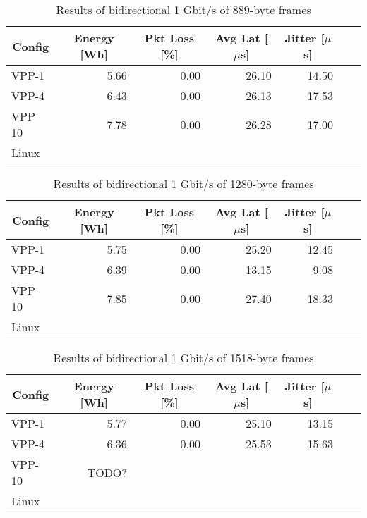 \begin{table}[h!]
\centering
\caption{Results of bidirectional 1 Gbit/s of 889-byte frames}
\begin{tabular}{|l|r|r|r|r|r|r|}
\hline
\multicolumn{1}{|c|}{\textbf{Config}} &
\multicolumn{1}{c|}{\textbf{Energy [Wh] }} &
\multicolumn{1}{c|}{\textbf{Pkt Loss [\%]}} &
\multicolumn{1}{c|}{\textbf{Avg Lat [$\mu$s]}} &
\multicolumn{1}{c|}{\textbf{Jitter [$\mu$s]}} \\
\hline 
VPP-1 & 5.66 & 0.00 & 26.10 & 14.50 \\
VPP-4 & 6.43 & 0.00 & 26.13 & 17.53 \\
VPP-10 & 7.78 & 0.00 & 26.28 & 17.00 \\
Linux &  &  &  &  \\
\hline
\end{tabular}
\label{tab:1budp:889B}
\end{table}

\begin{table}[h!]
\centering
\caption{Results of bidirectional 1 Gbit/s of 1280-byte frames}
\begin{tabular}{|l|r|r|r|r|r|r|}
\hline
\multicolumn{1}{|c|}{\textbf{Config}} &
\multicolumn{1}{c|}{\textbf{Energy [Wh] }} &
\multicolumn{1}{c|}{\textbf{Pkt Loss [\%]}} &
\multicolumn{1}{c|}{\textbf{Avg Lat [$\mu$s]}} &
\multicolumn{1}{c|}{\textbf{Jitter [$\mu$s]}} \\
\hline 
VPP-1 & 5.75 & 0.00 & 25.20 & 12.45 \\
VPP-4 & 6.39 & 0.00 & 13.15 & 9.08 \\
VPP-10 & 7.85 & 0.00 & 27.40 & 18.33 \\
Linux &  &  &  &  \\
\hline
\end{tabular}
\label{tab:1budp:1280B}
\end{table}

\begin{table}[h!]
\centering
\caption{Results of bidirectional 1 Gbit/s of 1518-byte frames}
\begin{tabular}{|l|r|r|r|r|r|r|}
\hline
\multicolumn{1}{|c|}{\textbf{Config}} &
\multicolumn{1}{c|}{\textbf{Energy [Wh] }} &
\multicolumn{1}{c|}{\textbf{Pkt Loss [\%]}} &
\multicolumn{1}{c|}{\textbf{Avg Lat [$\mu$s]}} &
\multicolumn{1}{c|}{\textbf{Jitter [$\mu$s]}} \\
\hline 
VPP-1 & 5.77 & 0.00 & 25.10 & 13.15 \\
VPP-4 & 6.36 & 0.00 & 25.53 & 15.63 \\
VPP-10 & TODO? &  &  &   \\
Linux &  &  &  &  \\
\hline
\end{tabular}
\label{tab:1budp:1518B}
\end{table}

